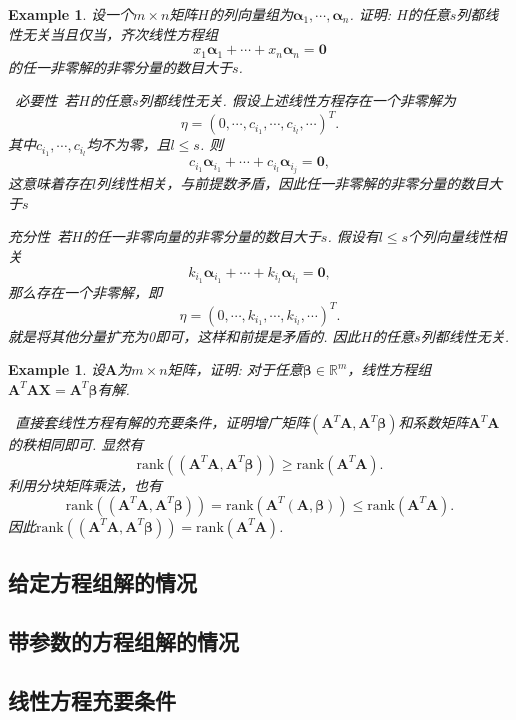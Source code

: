 \documentclass{article}
\newtheorem{example}[theorem]{Example}
\newcommand{\hints}{{\color{blue} \text{hints}}}
\newcommand{\mbf}[1]{\bm{#1}}
\newcommand{\rank}[1]{\text{rank}\left(#1\right)} %
\begin{document}
\begin{example}
\rm 设一个$m \times n$矩阵$H$的列向量组为$\mbf{\alpha}_1,\cdots,\mbf{\alpha}_n$. 证明: $H$的任意$s$列都线性无关当且仅当，齐次线性方程组
$$
x_1 \mbf{\alpha}_1 + \cdots + x_n \mbf{\alpha}_n = \mbf{0}
$$
的任一非零解的非零分量的数目大于$s$. 

\hints\ \emph{必要性}\ 若$H$的任意$s$列都线性无关. 假设上述线性方程存在一个非零解为
$$
\eta = (0,\cdots,c_{i_1},\cdots,c_{i_l},\cdots)^{T}. 
$$
其中$c_{i_1},\cdots,c_{i_l}$均不为零，且$ l \leq s$. 则
$$
c_{i_1}\mbf{\alpha}_{i_1}+\cdots+c_{i_l}\mbf{\alpha}_{i_j} = \mbf{0},
$$
这意味着存在$l$列线性相关，与前提数矛盾，因此任一非零解的非零分量的数目大于$s$

\emph{充分性}\ 若$H$的任一非零向量的非零分量的数目大于$s$. 假设有$l\leq s$个列向量线性相关
$$
k_{i_1}\mbf{\alpha}_{i_1}+\cdots+k_{i_l}\mbf{\alpha}_{i_l} = \mbf{0},
$$
那么存在一个非零解，即
$$
\eta = (0,\cdots,k_{i_1},\cdots,k_{i_l},\cdots)^{T}. 
$$
就是将其他分量扩充为0即可，这样和前提是矛盾的. 因此$H$的任意$s$列都线性无关. 
\end{example}

\begin{example}
\rm 设$\mbf{A}$为$m \times n$矩阵，证明: 对于任意$\mbf{\beta} \in \mathbb{R}^m$，线性方程组$\mbf{A}^T\mbf{A}\mbf{X} = \mbf{A}^T\mbf{\beta}$有解. 

\hints\ 直接套线性方程有解的充要条件，证明增广矩阵$(\mbf{A}^T\mbf{A},\mbf{A}^T\mbf{\beta})$和系数矩阵$\mbf{A}^T\mbf{A}$的秩相同即可. 显然有
$$
\rank{(\mbf{A}^T\mbf{A},\mbf{A}^T\mbf{\beta})} \geq \rank{\mbf{A}^T\mbf{A}}. 
$$
利用分块矩阵乘法，也有
$$
\rank{(\mbf{A}^T\mbf{A},\mbf{A}^T\mbf{\beta})} = \rank{\mbf{A}^T(\mbf{A},\mbf{\beta})} \leq \rank{\mbf{A}^T\mbf{A}}.
$$
因此$\rank{(\mbf{A}^T\mbf{A},\mbf{A}^T\mbf{\beta})} = \rank{\mbf{A}^T\mbf{A}}$. 
\end{example}

\subsection{给定方程组解的情况}


\subsection{带参数的方程组解的情况}


\subsection{线性方程充要条件}
\end{document}
